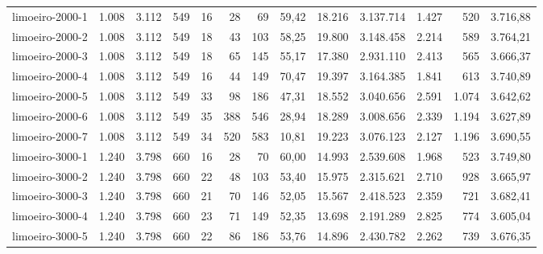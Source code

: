 \begin{table}[ht!]
{\begin{tabular}{lrrrrrrrrrrrr}
			\rowcolor{rowlight}limoeiro-2000-1                                                        & 1.008 & 3.112 & 549 & 16 & 28  & 69  & 59,42 & 18.216  & 3.137.714  & 1.427 & 520   & 3.716,88 \\
			\rowcolor{rowlight}limoeiro-2000-2                                                        & 1.008 & 3.112 & 549 & 18 & 43  & 103 & 58,25 & 19.800  & 3.148.458  & 2.214 & 589   & 3.764,21 \\
			\rowcolor{rowlight}limoeiro-2000-3                                                        & 1.008 & 3.112 & 549 & 18 & 65  & 145 & 55,17 & 17.380  & 2.931.110  & 2.413 & 565   & 3.666,37 \\
			\rowcolor{rowlight}limoeiro-2000-4                                                        & 1.008 & 3.112 & 549 & 16 & 44  & 149 & 70,47 & 19.397  & 3.164.385  & 1.841 & 613   & 3.740,89 \\
			\rowcolor{rowlight}limoeiro-2000-5                                                        & 1.008 & 3.112 & 549 & 33 & 98  & 186 & 47,31 & 18.552  & 3.040.656  & 2.591 & 1.074 & 3.642,62 \\
			\rowcolor{rowlight}limoeiro-2000-6                                                        & 1.008 & 3.112 & 549 & 35 & 388 & 546 & 28,94 & 18.289  & 3.008.656  & 2.339 & 1.194 & 3.627,89 \\
			\rowcolor{rowlight}limoeiro-2000-7                                                        & 1.008 & 3.112 & 549 & 34 & 520 & 583 & 10,81 & 19.223  & 3.076.123  & 2.127 & 1.196 & 3.690,55 \\
			\rowcolor{rowlight}limoeiro-3000-1                                                        & 1.240 & 3.798 & 660 & 16 & 28  & 70  & 60,00 & 14.993  & 2.539.608  & 1.968 & 523   & 3.749,80 \\
			\rowcolor{rowlight}limoeiro-3000-2                                                        & 1.240 & 3.798 & 660 & 22 & 48  & 103 & 53,40 & 15.975  & 2.315.621  & 2.710 & 928   & 3.665,97 \\
			\rowcolor{rowlight}limoeiro-3000-3                                                        & 1.240 & 3.798 & 660 & 21 & 70  & 146 & 52,05 & 15.567  & 2.418.523  & 2.359 & 721   & 3.682,41 \\
			\rowcolor{rowlight}limoeiro-3000-4                                                        & 1.240 & 3.798 & 660 & 23 & 71  & 149 & 52,35 & 13.698  & 2.191.289  & 2.825 & 774   & 3.605,04 \\
			\rowcolor{rowlight}limoeiro-3000-5                                                        & 1.240 & 3.798 & 660 & 22 & 86  & 186 & 53,76 & 14.896  & 2.430.782  & 2.262 & 739   & 3.676,35 \\

\end{tabular}}
\end{table}
